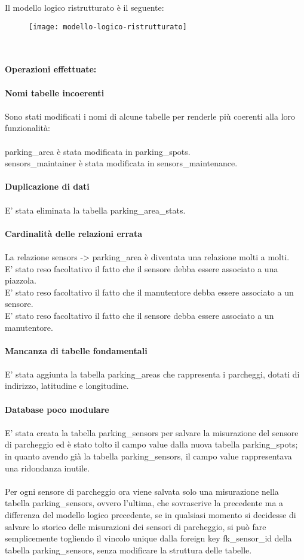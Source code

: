 Il modello logico ristrutturato è il seguente:
\begin{figure}[!h]
  \centering
  \texttt{[image: modello-logico-ristrutturato]}
\end{figure}
\\\\
\textbf{Operazioni effettuate:}
\\\\
\textbf{Nomi tabelle incoerenti}
\\\\
Sono stati modificati i nomi di alcune tabelle per renderle più coerenti alla loro funzionalità:
\\\\
parking\_area è stata modificata in parking\_spots.
\\
sensors\_maintainer è stata modificata in sensors\_maintenance.
\\\\
\textbf{Duplicazione di dati}
\\\\
E' stata eliminata la tabella parking\_area\_stats.
\\\\
\textbf{Cardinalità delle relazioni errata}
\\\\
La relazione sensors -> parking\_area è diventata una relazione molti a molti.
\\
E' stato reso facoltativo il fatto che il sensore debba essere associato a una piazzola.
\\
E' stato reso facoltativo il fatto che il manutentore debba essere associato a un sensore.
\\
E' stato reso facoltativo il fatto che il sensore debba essere associato a un manutentore.
\\\\
\textbf{Mancanza di tabelle fondamentali}
\\\\
E' stata aggiunta la tabella parking\_areas che rappresenta i parcheggi, dotati di indirizzo, latitudine e 
longitudine.
\\\\
\textbf{Database poco modulare}
\\\\
E' stata creata la tabella parking\_sensors per salvare la misurazione del sensore di parcheggio ed è
stato tolto il campo value dalla nuova tabella parking\_spots; in quanto avendo già la tabella parking\_sensors,
il campo value rappresentava una ridondanza inutile.
\\\\
Per ogni sensore di parcheggio ora viene salvata solo una misurazione nella tabella parking\_sensors, ovvero
l'ultima, che sovrascrive la precedente ma a differenza del modello logico precedente, se in qualsiasi momento
si decidesse di salvare lo storico delle misurazioni dei sensori di parcheggio, si può fare semplicemente togliendo
il vincolo unique dalla foreign key fk\_sensor\_id della tabella parking\_sensors, senza modificare la struttura delle tabelle.